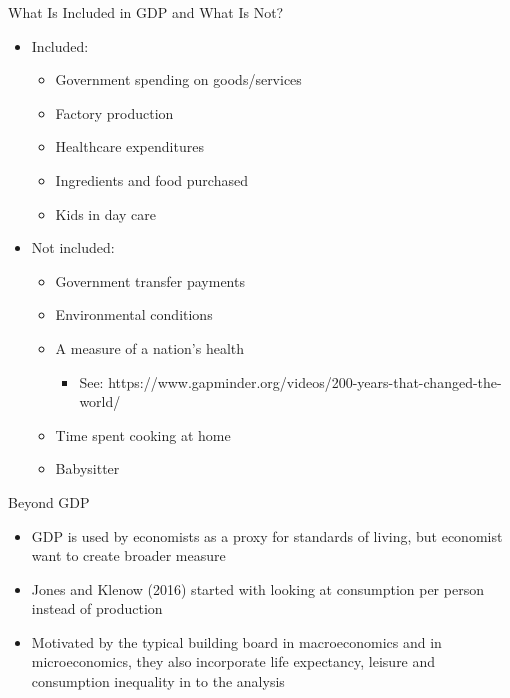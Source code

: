 \documentclass[aspectratio=1610]{beamer}
\begin{document}
\begin{frame}[wide]{What Is Included in GDP and What Is Not?}
	\begin{itemize}
		\item Included:
		\begin{itemize}
			\item Government spending on goods/services
			\item Factory production
			\item Healthcare expenditures
			\item Ingredients and food purchased
			\item Kids in day care
		\end{itemize}
		\item Not included:
		\begin{itemize}
			\item Government transfer payments
			\item Environmental conditions
			\item A measure of a nation’s health 
			\begin{itemize}
				\item See: https://www.gapminder.org/videos/200-years-that-changed-the-world/
			\end{itemize}
			\item Time spent cooking at home
			\item Babysitter
		\end{itemize}
		
	\end{itemize}
\end{frame}

\begin{frame}[wide]{Beyond GDP}
	\begin{itemize}
		\item GDP is used by economists as a proxy for standards of living, but economist want to create broader measure
		\item Jones and Klenow (2016) started with looking at consumption per person instead of production
		\item Motivated by the typical building board in macroeconomics and in microeconomics, they also incorporate life expectancy, leisure and consumption inequality in to the analysis
	\end{itemize}
\end{frame}
\end{document}
